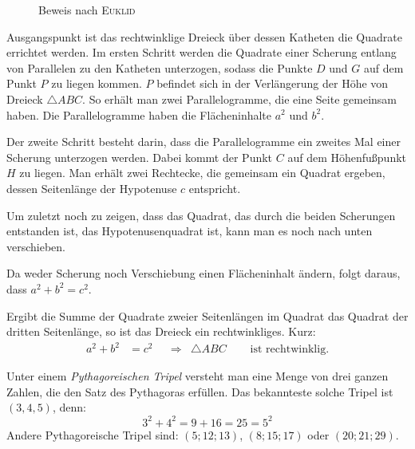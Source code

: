 \begin{bew}
\begin{figure}
\begin{center}
\end{center}
 \caption{Beweis nach \textsc{Euklid}}
\end{figure}

Ausgangspunkt ist das rechtwinklige Dreieck über dessen Katheten die Quadrate errichtet werden. Im ersten Schritt werden die Quadrate einer Scherung entlang von Parallelen zu den Katheten unterzogen, sodass die Punkte \(D\) und \(G\) auf dem Punkt \(P\) zu liegen kommen. \(P\) befindet sich in der Verlängerung der Höhe von Dreieck \(\triangle ABC\). So erhält man zwei Parallelogramme, die eine Seite gemeinsam haben. Die Parallelogramme haben die Flächeninhalte \(a^2\) und \(b^2\).

Der zweite Schritt besteht darin, dass die Parallelogramme ein zweites Mal einer Scherung unterzogen werden. Dabei kommt der Punkt \(C\) auf dem Höhenfußpunkt \(H\) zu liegen. Man erhält zwei Rechtecke, die gemeinsam ein Quadrat ergeben, dessen Seitenlänge der Hypotenuse \(c\) entspricht.

Um zuletzt noch zu zeigen, dass das Quadrat, das durch die beiden Scherungen entstanden ist, das Hypotenusenquadrat ist, kann man es noch nach unten verschieben.

Da weder Scherung noch Verschiebung einen Flächeninhalt ändern, folgt daraus, dass \(a^2+b^2 = c^2\).

\end{bew}

\begin{satz}
 Ergibt die Summe der Quadrate zweier Seitenlängen im Quadrat das Quadrat der dritten Seitenlänge, so ist das Dreieck ein rechtwinkliges. Kurz:
 \begin{align*}
  a^2+b^2&=c^2&&\Rightarrow & \triangle ABC & \quad\text{ ist rechtwinklig.} 
 \end{align*}
\end{satz}

\begin{defi}
 Unter einem \emph{Pythagoreischen Tripel} versteht man eine Menge von drei ganzen Zahlen, die den Satz des Pythagoras erfüllen. Das bekannteste solche Tripel ist \((3,4,5)\), denn:
 \begin{equation*}
  3^2+4^2 = 9 +16 =25 =5^2
 \end{equation*}
 Andere Pythagoreische Tripel sind: \((5;12;13)\), \((8;15;17)\) oder \((20;21;29)\).
\end{defi}


